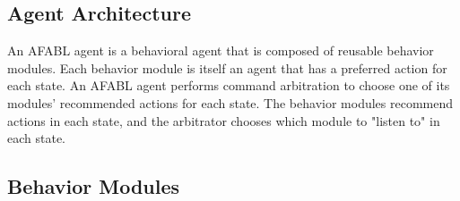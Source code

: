 






\subsection{Agent Architecture}

An AFABL agent is a behavioral agent that is composed of reusable behavior modules.    Each behavior module is itself an agent that has a preferred action for each state.  An AFABL agent performs command arbitration to choose one of its modules' recommended actions for each state.  The behavior modules recommend actions in each state, and the arbitrator chooses which module to "listen to" in each state.  

\subsection{Behavior Modules}

